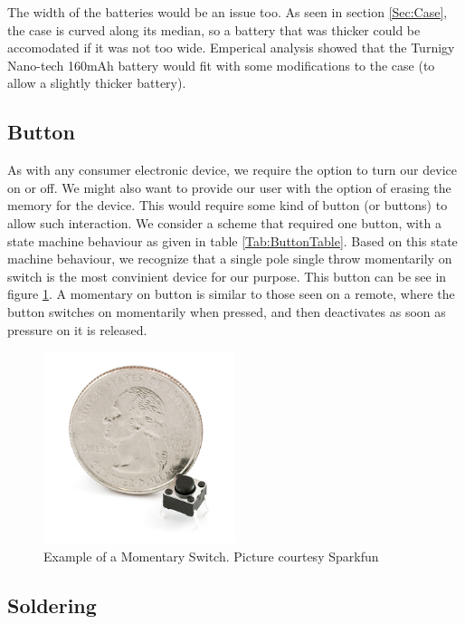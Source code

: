 The width of the batteries would be an issue too.
As seen in section \ref{Sec:Case},
the case is curved along its median,
so a battery that was thicker could be accomodated if it was not too wide.
Emperical analysis showed that the Turnigy Nano-tech 160mAh battery
would fit with some modifications to the case (to allow a slightly thicker battery).

\subsection{Button}
\label{Sec:Button}
As with any consumer electronic device, we require the option to turn our device on or off. We might also want to provide our user with the option of erasing the memory for the device. This would require some kind of button (or buttons) to allow such interaction. We consider a scheme that required one button, with a state machine behaviour as given in table \ref{Tab:ButtonTable}. Based on this state machine behaviour, we recognize that a single pole single throw momentarily on switch is the most convinient device for our purpose. This button can be see in figure \ref{Fig:MomButton}. A momentary on button is similar to those seen on a remote, where the button switches on momentarily when pressed, and then deactivates as soon as pressure on it is released.
\begin{figure}
\begin{center}
\includegraphics[width=0.5\textwidth]{images/MOMButton.jpg}
\caption{Example of a Momentary Switch. Picture courtesy Sparkfun}
\label{Fig:MomButton}
\end{center}
\end{figure}



\label{Sec:CircuitDesign}
\label{Sec:Software}

\subsection{Soldering}
\label{Sec:Soldering}
